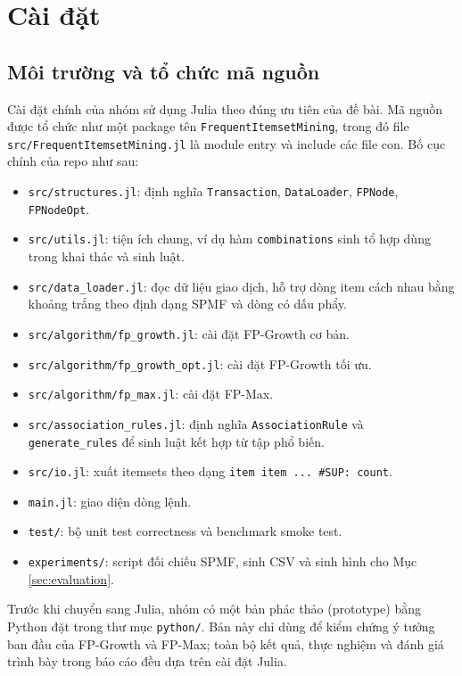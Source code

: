 \section{Cài đặt}
\label{sec:implementation}

\subsection{Môi trường và tổ chức mã nguồn}

Cài đặt chính của nhóm sử dụng Julia theo đúng ưu tiên của đề bài. Mã nguồn được tổ chức như một package tên \texttt{FrequentItemsetMining}, trong đó file \texttt{src/FrequentItemsetMining.jl} là module entry và include các file con. Bố cục chính của repo như sau:

\begin{itemize}
    \item \texttt{src/structures.jl}: định nghĩa \texttt{Transaction}, \texttt{DataLoader}, \texttt{FPNode}, \texttt{FPNodeOpt}.
    \item \texttt{src/utils.jl}: tiện ích chung, ví dụ hàm \texttt{combinations} sinh tổ hợp dùng trong khai thác và sinh luật.
    \item \texttt{src/data\_loader.jl}: đọc dữ liệu giao dịch, hỗ trợ dòng item cách nhau bằng khoảng trắng theo định dạng SPMF và dòng có dấu phẩy.
    \item \texttt{src/algorithm/fp\_growth.jl}: cài đặt FP-Growth cơ bản.
    \item \texttt{src/algorithm/fp\_growth\_opt.jl}: cài đặt FP-Growth tối ưu.
    \item \texttt{src/algorithm/fp\_max.jl}: cài đặt FP-Max.
    \item \texttt{src/association\_rules.jl}: định nghĩa \texttt{AssociationRule} và \texttt{generate\_rules} để sinh luật kết hợp từ tập phổ biến.
    \item \texttt{src/io.jl}: xuất itemsets theo dạng \texttt{item item ... \#SUP: count}.
    \item \texttt{main.jl}: giao diện dòng lệnh.
    \item \texttt{test/}: bộ unit test correctness và benchmark smoke test.
    \item \texttt{experiments/}: script đối chiếu SPMF, sinh CSV và sinh hình cho Mục \ref{sec:evaluation}.
\end{itemize}

Trước khi chuyển sang Julia, nhóm có một bản phác thảo (prototype) bằng Python đặt trong thư mục \texttt{python/}. Bản này chỉ dùng để kiểm chứng ý tưởng ban đầu của FP-Growth và FP-Max; toàn bộ kết quả, thực nghiệm và đánh giá trình bày trong báo cáo đều dựa trên cài đặt Julia.

